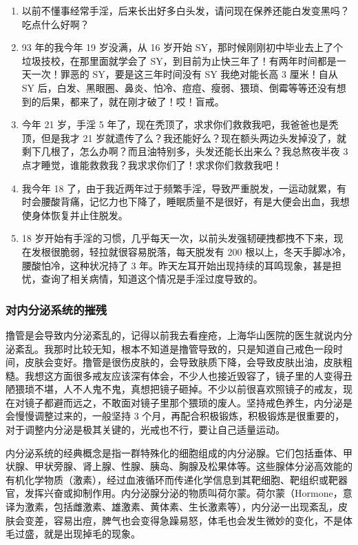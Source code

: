 \documentclass[fontset=founder]{ctexart}
\begin{document}
\begin{enumerate}
    \item 以前不懂事经常手淫，后来长出好多白头发，请问现在保养还能白发变黑吗？吃点什么好啊？
    \item 93 年的我今年 19 岁没满，从 16 岁开始 SY，那时候刚刚初中毕业去上了个垃圾技校，在那里面就学会了 SY，到目前为止快三年了！有两年时间都是一天一次！罪恶的 SY，要是这三年时间没有 SY 我绝对能长高 3 厘米！自从 SY 后，白发、黑眼圈、鼻炎、怕冷、痘痘、瘦弱、猥琐、倒霉等等还没有想到的后果，都来了，就在刚才破了！哎！盲戒。
    \item 今年 21 岁，手淫 5 年了，现在秃顶了，求求你们救救我吧，我爸爸也是秃顶，但是我才 21 岁就遗传了么？我还能好么？现在额头两边头发掉没了，就剩下几根了，怎么办啊？而且油特别多，头发还能长出来么？我总熬夜半夜 3 点才睡觉，谁能救救我？我求求你们了！求求你们救救我吧！
    \item 我今年 18 了，由于我近两年过于频繁手淫，导致严重脱发，一运动就累，有时会腰酸背痛，记忆力也下降了，睡眠质量不是很好，有是大便会出血，我想使身体恢复并止住脱发。
    \item 18 岁开始有手淫的习惯，几乎每天一次，以前头发强韧硬拽都拽不下来，现在发根很脆弱，轻拉就很容易脱落，每天脱发有 200 根以上，冬天手脚冰冷，腰酸怕冷，这种状况持了 3 年。昨天左耳开始出现持续的耳鸣现象，甚是担忧，查询了相关病情，知道这个情况是手淫过度导致的。
\end{enumerate}

\subsubsection{对内分泌系统的摧残}

撸管是会导致内分泌紊乱的，记得以前我去看痤疮，上海华山医院的医生就说内分泌紊乱。我那时比较无知，根本不知道是撸管导致的，只是知道自己戒色一段时间，皮肤会变好。撸管是很伤皮肤的，会导致肤质下降，会导致皮肤出油，皮肤粗糙。我想这方面很多戒友应该深有体会，不少人也接近毁容了，镜子里的人变得丑陋猥琐不堪，人不人鬼不鬼，真想把镜子砸掉。不少以前很喜欢照镜子的戒友，现在对镜子都避而远之，不敢面对镜子里那个猥琐的废人。坚持戒色养生，内分泌是会慢慢调整过来的，一般坚持 3 个月，再配合积极锻炼，积极锻炼是很重要的，对于调整内分泌是极其关键的，光戒也不行，要让自己适量运动。

内分泌系统的经典概念是指一群特殊化的细胞组成的内分泌腺。它们包括垂体、甲状腺、甲状旁腺、肾上腺、性腺、胰岛、胸腺及松果体等。这些腺体分泌高效能的有机化学物质（激素），经过血液循环而传递化学信息到其靶细胞、靶组织或靶器官，发挥兴奋或抑制作用。内分泌腺分泌的物质叫荷尔蒙。荷尔蒙（Hormone，意译为激素，包括雌激素、雄激素、黄体素、生长激素等），内分泌一出现紊乱，皮肤会变差，容易出痘，脾气也会变得急躁易怒，体毛也会发生微妙的变化，不是体毛过盛，就是出现掉毛的现象。
\end{document}
